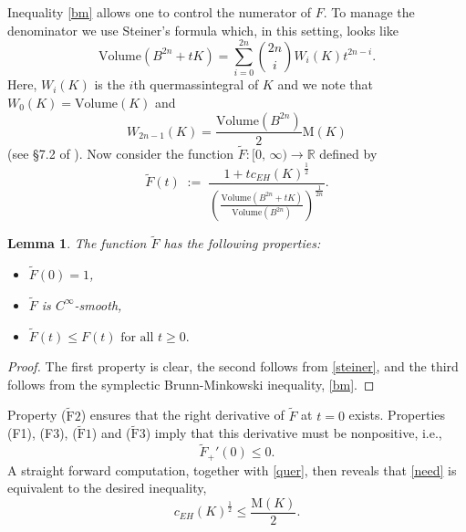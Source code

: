 \documentclass[12pt]{amsart}
\newtheorem{lemma}[theorem]{Lemma}
\theoremstyle{definition}
\newcommand{\eqdef}{\;{:=}\;}
\newcommand{\RR}{{\mathbb R}}
\newcommand{\V}{{\mathrm {Volume}}}
\newcommand{\mw}{{{\mathrm {M}}}}
\begin{document}
Inequality \eqref{bm} allows one to control the numerator of $F$. To manage the denominator we use Steiner's formula which, in this setting, looks like
\begin{equation}\label{steiner}
    \V(B^{2n}+tK) = \sum_{i=0}^{2n} \binom{2n}{i} W_i(K) t^{2n-i}.
\end{equation}
Here, $W_i(K)$ is the $i$th quermassintegral of $K$ and we note that $W_0(K) = \V(K)$ and \begin{equation}\label{quer}
    W_{2n-1}(K) = \frac{\V(B^{2n})}{2} \mw(K) 
\end{equation} (see \S 7.2 of \cite{schn}). Now consider the function $\widetilde{F}\colon [0,\, \infty) \to \RR$ defined by
\begin{equation*} \widetilde{F}(t) \eqdef  \frac{1+tc_{EH}(K)^{\frac{1}{2}}}{\left(\frac{\V(B^{2n} + tK)}{\V(B^{2n})}\right)^{\frac{1}{2n}}}.\end{equation*}

\begin{lemma}\label{tilde} The function $\widetilde{F}$ has the following properties:
\begin{itemize}
    \item[($\widetilde{\mathrm{F}}1$)] $\widetilde{F}(0)=1$,
    \item[($\widetilde{\mathrm{F}}2$)] $\widetilde{F}$ is $C^{\infty}$-smooth,
    \item[($\widetilde{\mathrm{F}}3$)]  $\widetilde{F}(t) \leq F(t) \text{  for all  } t \geq 0.$   
\end{itemize}
\end{lemma}

\begin{proof} The first property is clear, the second follows from \eqref{steiner}, and the third follows from the symplectic Brunn-Minkowski inequality, \eqref{bm}. \end{proof} 

Property ($\widetilde{\mathrm{F}}2$) ensures that the right derivative of $\widetilde{F}$ at $t=0$ exists. Properties (F1), (F3), ($\widetilde{\mathrm{F}}1$) and ($\widetilde{\mathrm{F}}3$) imply that this derivative must be nonpositive, i.e.,
\begin{equation}\label{need}
    \widetilde{F}_+'(0) \leq 0.
\end{equation}
A straight forward computation, together with \eqref{quer}, then reveals that \eqref{need} is equivalent to the desired inequality,
$$c_{EH}(K)^{\frac{1}{2}} \leq \frac{\mw(K)}{2}.$$
\end{document}
